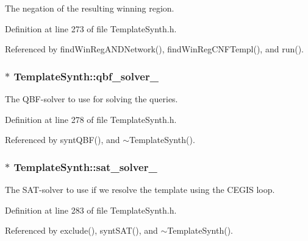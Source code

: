 The negation of the resulting winning region. 



Definition at line 273 of file Template\-Synth.\-h.



Referenced by find\-Win\-Reg\-A\-N\-D\-Network(), find\-Win\-Reg\-C\-N\-F\-Templ(), and run().

\hypertarget{classTemplateSynth_a08ec20197bf16a10546a7e6cf3719727}{
\subsubsection[{qbf\-\_\-solver\-\_\-}]{$\ast$ Template\-Synth\-::qbf\-\_\-solver\-\_\-\hspace{0.3cm}{\ttfamily [protected]}}}\label{classTemplateSynth_a08ec20197bf16a10546a7e6cf3719727}


The Q\-B\-F-\/solver to use for solving the queries. 



Definition at line 278 of file Template\-Synth.\-h.



Referenced by synt\-Q\-B\-F(), and $\sim$\-Template\-Synth().

\hypertarget{classTemplateSynth_a7844e9296d63b10e3fa96d66b932660f}{
\subsubsection[{sat\-\_\-solver\-\_\-}]{$\ast$ Template\-Synth\-::sat\-\_\-solver\-\_\-\hspace{0.3cm}{\ttfamily [protected]}}}\label{classTemplateSynth_a7844e9296d63b10e3fa96d66b932660f}


The S\-A\-T-\/solver to use if we resolve the template using the C\-E\-G\-I\-S loop. 



Definition at line 283 of file Template\-Synth.\-h.



Referenced by exclude(), synt\-S\-A\-T(), and $\sim$\-Template\-Synth().

